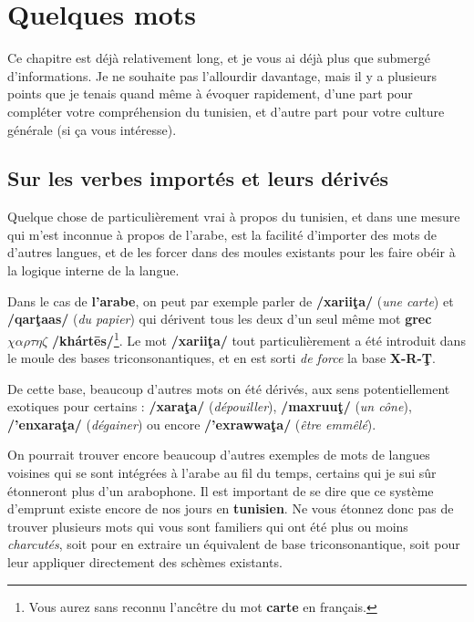 \section{Quelques mots}
Ce chapitre est déjà relativement long, et je vous ai déjà plus que submergé d'informations. Je ne souhaite pas l'allourdir davantage, mais il y a plusieurs points que je tenais quand même à évoquer rapidement, d'une part pour compléter votre compréhension du tunisien, et d'autre part pour votre culture générale (si ça vous intéresse).

\subsection{Sur les verbes importés et leurs dérivés}
Quelque chose de particulièrement vrai à propos du tunisien, et dans une mesure qui m'est inconnue à propos de l'arabe, est la facilité d'importer des mots de d'autres langues, et de les forcer dans des moules existants pour les faire obéir à la logique interne de la langue. 

Dans le cas de \textbf{l'arabe}, on peut par exemple parler de  \textbf{/xarii\c{t}a/} (\textit{une carte}) et  \textbf{/qar\c{t}aas/} (\textit{du papier}) qui dérivent tous les deux d'un seul même mot \textbf{grec} $\chi\alpha\rho\tau\eta\zeta$ \textbf{/khártēs/}\footnote{Vous aurez sans reconnu l'ancêtre du mot \textbf{carte} en français.}. Le mot \textbf{/xarii\c{t}a/} tout particulièrement a été introduit dans le moule des bases triconsonantiques, et en est sorti \textit{de force} la base \textbf{X-R-\c{T}}.

De cette base, beaucoup d'autres mots on été dérivés, aux sens potentiellement exotiques pour certains : \textbf{/xara\c{t}a/} (\textit{dépouiller}), \textbf{/maxruu\c{t}/} (\textit{un cône}), \textbf{/'enxara\c{t}a/} (\textit{dégainer}) ou encore \textbf{/'exrawwa\c{t}a/} (\textit{être emmêlé}).

On pourrait trouver encore beaucoup d'autres exemples de mots de langues voisines qui se sont intégrées à l'arabe au fil du temps, certains qui je sui sûr étonneront plus d'un arabophone. Il est important de se dire que ce système d'emprunt existe encore de nos jours en \textbf{tunisien}. Ne vous étonnez donc pas de trouver plusieurs mots qui vous sont familiers qui ont été plus ou moins \textit{charcutés}, soit pour en extraire un équivalent de base triconsonantique, soit pour leur appliquer directement des schèmes existants.

